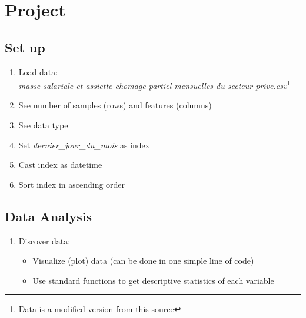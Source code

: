 
\setcounter{section}{0}


\section{Project}


\subsection{Set up}

\begin{enumerate}
    \item Load data:\\
    \textit{masse-salariale-et-assiette-chomage-partiel-mensuelles-du-secteur-prive.csv}\footnote{\href{https://www.data.gouv.fr/fr/datasets/masse-salariale-et-assiette-chomage-partiel-mensuelles-du-secteur-prive/}{Data is a modified version from this source}}
    \item See number of samples (rows) and features (columns)
    \item See data type
    \item Set \textit{dernier\_jour\_du\_mois} as index
    \item Cast index as datetime
    \item Sort index in ascending order
\end{enumerate}


\subsection{Data Analysis}

\begin{enumerate}
    \item Discover data:
    \begin{itemize}
        \item Visualize (plot) data (can be done in one simple line of code)
        \item Use standard functions to get descriptive statistics of each variable
    \end{itemize}
\end{enumerate}

